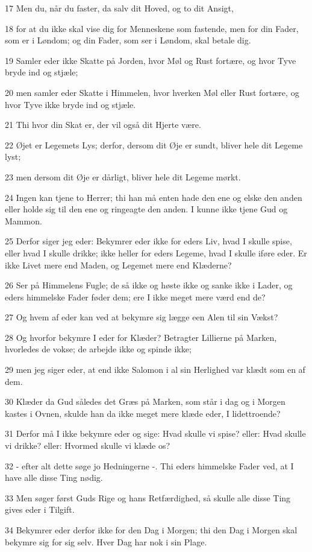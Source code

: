 \par 17 Men du, når du faster, da salv dit Hoved, og to dit Ansigt,
\par 18 for at du ikke skal vise dig for Menneskene som fastende, men for din Fader, som er i Løndom; og din Fader, som ser i Løndom, skal betale dig.
\par 19 Samler eder ikke Skatte på Jorden, hvor Møl og Rust fortære, og hvor Tyve bryde ind og stjæle;
\par 20 men samler eder Skatte i Himmelen, hvor hverken Møl eller Rust fortære, og hvor Tyve ikke bryde ind og stjæle.
\par 21 Thi hvor din Skat er, der vil også dit Hjerte være.
\par 22 Øjet er Legemets Lys; derfor, dersom dit Øje er sundt, bliver hele dit Legeme lyst;
\par 23 men dersom dit Øje er dårligt, bliver hele dit Legeme mørkt.
\par 24 Ingen kan tjene to Herrer; thi han må enten hade den ene og elske den anden eller holde sig til den ene og ringeagte den anden. I kunne ikke tjene Gud og Mammon.
\par 25 Derfor siger jeg eder: Bekymrer eder ikke for eders Liv, hvad I skulle spise, eller hvad I skulle drikke; ikke heller for eders Legeme, hvad I skulle iføre eder. Er ikke Livet mere end Maden, og Legemet mere end Klæderne?
\par 26 Ser på Himmelens Fugle; de så ikke og høste ikke og sanke ikke i Lader, og eders himmelske Fader føder dem; ere I ikke meget mere værd end de?
\par 27 Og hvem af eder kan ved at bekymre sig lægge een Alen til sin Vækst?
\par 28 Og hvorfor bekymre I eder for Klæder? Betragter Lillierne på Marken, hvorledes de vokse; de arbejde ikke og spinde ikke;
\par 29 men jeg siger eder, at end ikke Salomon i al sin Herlighed var klædt som en af dem.
\par 30 Klæder da Gud således det Græs på Marken, som står i dag og i Morgen kastes i Ovnen, skulde han da ikke meget mere klæde eder, I lidettroende?
\par 31 Derfor må I ikke bekymre eder og sige: Hvad skulle vi spise? eller: Hvad skulle vi drikke? eller: Hvormed skulle vi klæde os?
\par 32 - efter alt dette søge jo Hedningerne -. Thi eders himmelske Fader ved, at I have alle disse Ting nødig.
\par 33 Men søger først Guds Rige og hans Retfærdighed, så skulle alle disse Ting gives eder i Tilgift.
\par 34 Bekymrer eder derfor ikke for den Dag i Morgen; thi den Dag i Morgen skal bekymre sig for sig selv. Hver Dag har nok i sin Plage.

